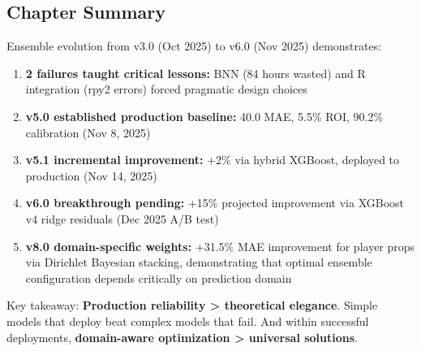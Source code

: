 \subsection{Chapter Summary}

Ensemble evolution from v3.0 (Oct 2025) to v6.0 (Nov 2025) demonstrates:
\begin{enumerate}[itemsep=2pt,parsep=0pt]
    \item \textbf{2 failures taught critical lessons:} BNN (84 hours wasted) and R integration (rpy2 errors) forced pragmatic design choices
    \item \textbf{v5.0 established production baseline:} 40.0 MAE, 5.5\% ROI, 90.2\% calibration (Nov 8, 2025)
    \item \textbf{v5.1 incremental improvement:} +2\% via hybrid XGBoost, deployed to production (Nov 14, 2025)
    \item \textbf{v6.0 breakthrough pending:} +15\% projected improvement via XGBoost v4 ridge residuals (Dec 2025 A/B test)
    \item \textbf{v8.0 domain-specific weights:} +31.5\% MAE improvement for player props via Dirichlet Bayesian stacking, demonstrating that optimal ensemble configuration depends critically on prediction domain
\end{enumerate}

Key takeaway: \textbf{Production reliability > theoretical elegance}. Simple models that deploy beat complex models that fail. And within successful deployments, \textbf{domain-aware optimization > universal solutions}.
